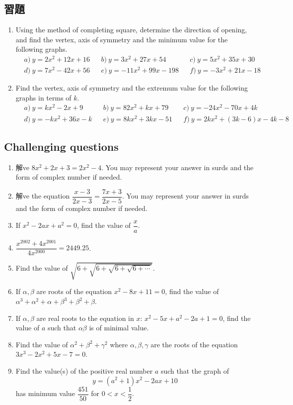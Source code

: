 \documentclass[12pt]{article}
\begin{document}
    \subsection*{習題}
    \begin{enumerate}
        \item Using the method of completing square, determine the direction of opening, and find the vertex, axis of symmetry and the minimum value for the following graphs.\begin{align*}
            &a)\ y=2x^2+12x+16&&b)\ y=3x^2+27x+54&&c)\ y=5x^2+35x+30\\
            &d)\ y=7x^2-42x+56&&e)\ y=-11x^2+99x-198&&f)\ y=-3x^2+21x-18
        \end{align*}
        \item Find the vertex, axis of symmetry and the extremum value for the following graphs in terms of $k$.\begin{align*}
            &a)\ y=kx^2-2x+9&&b)\ y=82x^2+kx+79&&c)\ y=-24x^2-70x+4k\\
            &d)\ y=-kx^2+36x-k&&e)\ y=8kx^2+3kx-51&&f)\ y=2kx^2+(3k-6)x-4k-8
        \end{align*}
    \end{enumerate}

    \pagebreak

    \subsection*{Challenging questions}
    \begin{enumerate}
        \item 解ve $8x^2+2x+3=2x^2-4$. You may represent your answer in surds and the form of complex number if needed.
        \item 解ve the equation $\dfrac{x-3}{2x-3}=\dfrac{7x+3}{2x-5}$. You may represent your answer in surds and the form of complex number if needed.
        \item If $x^2-2ax+a^2=0$, find the value of $\dfrac{x}{a}$.
        \item $\dfrac{x^{2002}+4x^{2001}}{4x^{2000}}=2449.25$.
        \item Find the value of $\sqrt{6+\sqrt{6+\sqrt{6+\sqrt{6+\cdots}}}}$.
        \item If $\alpha,\beta$ are roots of the equation $x^2-8x+11=0$, find the value of $\alpha^3+\alpha^2+\alpha+\beta^3+\beta^2+\beta$.
        \item If $\alpha,\beta$ are real roots to the equation in $x$: $x^2-5x+a^2-2a+1=0$, find the value of $a$ such that $\alpha\beta$ is of minimal value.
        \item Find the value of $\alpha^2+\beta^2+\gamma^2$ where $\alpha,\beta,\gamma$ are the roots of the equation $3x^3-2x^2+5x-7=0$.
        \item Find the value(s) of the positive real number $a$ such that the graph of $$y=(a^2+1)x^2-2ax+10$$ has minimum value $\dfrac{451}{50}$ for $0<x<\dfrac{1}{2}$.
    \end{enumerate}
\end{document}

